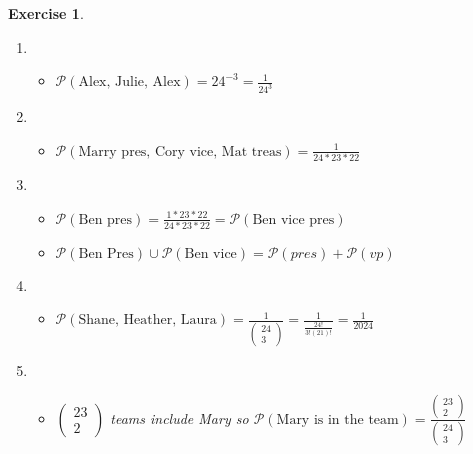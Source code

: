 \documentclass[a4paper]{article}
\newcounter{counter}
\numberwithin{counter}{subsection}
\theoremstyle{break}
\newtheorem{exe}[counter]{Exercise}
\begin{document}
\begin{exe}
	\begin{sol}
		\begin{enumerate}
			\item \begin{itemize}
                \item $\mathcal{P}(\text{Alex, Julie, Alex}) = 24^{-3} = \frac{1}{24^3}$
			\end{itemize}
		\item \begin{itemize}
            \item $\mathcal{P}(\text{Marry pres, Cory vice, Mat treas}) = \frac{1}{24 * 23 * 22}$
		\end{itemize}
	\item \begin{itemize}
        \item $\mathcal{P}(\text{Ben pres}) = \frac{1*23*22}{24*23*22} = \mathcal{P}(\text{Ben vice pres})$
        \item $\mathcal{P}(\text{Ben Pres}) \cup \mathcal{P}(\text{Ben vice}) = \mathcal{P}(pres) + \mathcal{P}(vp)$ 
	\end{itemize}
		\item \begin{itemize}
			\item $\mathcal{P}(\text{Shane, Heather, Laura}) = \frac{1}{\begin{pmatrix} 24 \\ 3 \end{pmatrix}} = \frac{1}{\frac{24!}{3!(21)!}}= \frac{1}{2024}$
		\end{itemize}
		\item \begin{itemize}
            \item $\begin{pmatrix} 23 \\ 2 \end{pmatrix}$ teams include Mary so $\mathcal{P}(\text{Mary is in the team}) = \frac{\begin{pmatrix} 23 \\ 2 \end{pmatrix}}{\begin{pmatrix} 24 \\ 3 \end{pmatrix}} $
		\end{itemize}
	\end{enumerate}
	\end{sol}
\end{exe}
\end{document}
